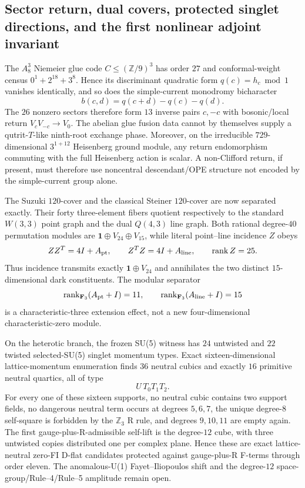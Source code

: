 \subsection{Sector return, dual covers, protected singlet directions, and the first nonlinear adjoint invariant}
\label{sec:20260916-sector-flatness-decoder-quartic}

The $A_8^3$ Niemeier glue code $C\le (\mathbb Z/9)^3$ has order $27$ and conformal-weight census $0^1+2^{18}+3^8$.  Hence its discriminant quadratic form $q(c)=h_c\bmod1$ vanishes identically, and so does the simple-current monodromy bicharacter
\[
 b(c,d)=q(c+d)-q(c)-q(d).
\]
The $26$ nonzero sectors therefore form $13$ inverse pairs $c,-c$ with bosonic/local return $V_cV_{-c}\to V_0$.  The abelian glue fusion data cannot by themselves supply a qutrit-$T$-like ninth-root exchange phase.  Moreover, on the irreducible $729$-dimensional $3^{1+12}$ Heisenberg ground module, any return endomorphism commuting with the full Heisenberg action is scalar.  A non-Clifford return, if present, must therefore use noncentral descendant/OPE structure not encoded by the simple-current group alone.

The Suzuki $120$-cover and the classical Steiner $120$-cover are now separated exactly.  Their forty three-element fibers quotient respectively to the standard $W(3,3)$ point graph and the dual $Q(4,3)$ line graph.  Both rational degree-$40$ permutation modules are $\mathbf1\oplus V_{24}\oplus V_{15}$, while literal point--line incidence $Z$ obeys
\[
 ZZ^T=4I+A_{\rm pt},\qquad Z^TZ=4I+A_{\rm line},\qquad \operatorname{rank}Z=25.
\]
Thus incidence transmits exactly $\mathbf1\oplus V_{24}$ and annihilates the two distinct $15$-dimensional dark constituents.  The modular separator
\[
 \operatorname{rank}_{\mathbf F_3}(A_{\rm pt}+I)=11,
 \qquad
 \operatorname{rank}_{\mathbf F_3}(A_{\rm line}+I)=15
\]
is a characteristic-three extension effect, not a new four-dimensional characteristic-zero module.

On the heterotic branch, the frozen SU(5) witness has $24$ untwisted and $22$ twisted selected-SU(5) singlet momentum types.  Exact sixteen-dimensional lattice-momentum enumeration finds $36$ neutral cubics and exactly $16$ primitive neutral quartics, all of type
\[
 U\,T_0T_1T_2.
\]
For every one of these sixteen supports, no neutral cubic contains two support fields, no dangerous neutral term occurs at degrees $5,6,7$, the unique degree-$8$ self-square is forbidden by the $\mathbb Z_3$ R rule, and degrees $9,10,11$ are empty again.  The first gauge-plus-R-admissible self-lift is the degree-$12$ cube, with three untwisted copies distributed one per complex plane.  Hence these are exact lattice-neutral zero-FI D-flat candidates protected against gauge-plus-R F-terms through order eleven.  The anomalous-U(1) Fayet--Iliopoulos shift and the degree-$12$ space-group/Rule--4/Rule--5 amplitude remain open.

